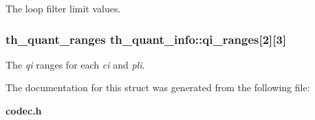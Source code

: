 The loop filter limit values. 

\subsubsection{\setlength{\rightskip}{0pt plus 5cm}\bf{th\_\-quant\_\-ranges} \bf{th\_\-quant\_\-info::qi\_\-ranges}[2][3]}\label{structth__quant__info_6feacf4b365e305a7df7b93d87ee7bb8}


The {\em qi\/} ranges for each {\em ci\/} and {\em pli\/}. 



The documentation for this struct was generated from the following file:\begin{CompactItemize}
\item 
\bf{codec.h}\end{CompactItemize}
